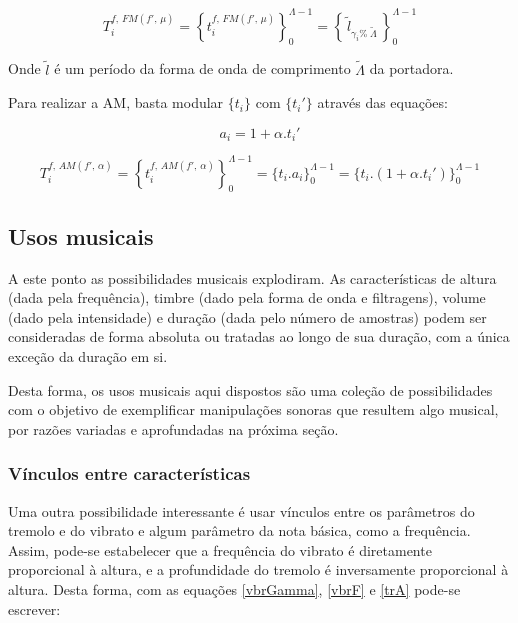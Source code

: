 \begin{equation}\label{fmT}
T_i^{f,\, FM(f',\,\mu)}=\left\{ t_i^{f,\,FM(f',\,\mu)} \right\}_0^{\Lambda-1}=\left\{\,\widetilde{l}_{\gamma_i \%\; \widetilde{\Lambda} } \,\right\}_0^{\Lambda-1}
\end{equation}

Onde $\widetilde{l}$ é um período da forma de onda de comprimento $\widetilde{\Lambda}$ da portadora.

Para realizar a AM, basta modular $\{t_i\}$ com $\{t_i'\}$ através das equações:

\begin{equation}\label{amA}
a_i=1 + \alpha . t_i'
\end{equation}

\begin{equation}\label{amT}
T_i^{f,\,AM(f',\,\alpha)}=\left\{ t_i^{f,\,AM(f',\,\alpha)} \right\}_0^{\Lambda-1}=\{ t_i . a_i \}_0^{\Lambda-1}=\{t_i . (1 + \alpha . t_i')    \}_0^{\Lambda-1}
\end{equation}



\subsection{Usos musicais}\label{subsec:mus2}
A este ponto as possibilidades musicais explodiram. As
características de altura (dada pela frequência),
timbre (dado pela forma de onda e filtragens),
volume (dado pela intensidade) e duração (dada pelo número de amostras)
podem ser consideradas
de forma absoluta ou tratadas ao longo de sua duração,
com a única exceção da duração em si.

Desta forma, os usos musicais aqui dispostos são uma coleção de possibilidades
com o objetivo de exemplificar manipulações sonoras que resultem algo
musical, por razões variadas e aprofundadas na próxima seção.

\subsubsection{Vínculos entre características}

Uma outra possibilidade interessante é usar vínculos
entre os parâmetros do tremolo e do vibrato e algum parâmetro da nota básica,
como a frequência. Assim, pode-se estabelecer que
a frequência do vibrato é diretamente proporcional à altura, e a profundidade do tremolo é inversamente proporcional
à altura.
Desta forma, com as equações \ref{vbrGamma}, \ref{vbrF} e \ref{trA}
pode-se escrever:

